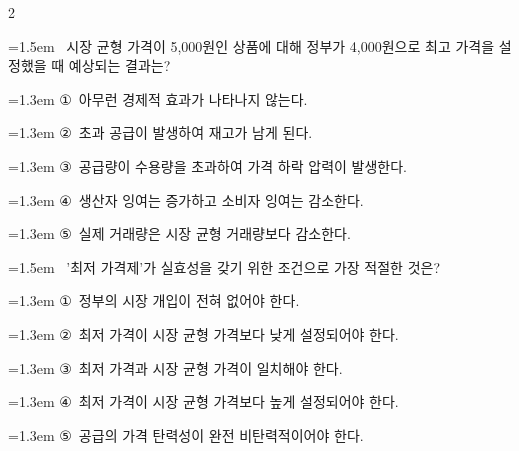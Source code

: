 \documentclass[10pt, a4paper]{article}
\begin{document}
\begin{multicols}{2}
\noindent\begin{minipage}{\columnwidth}
\vspace{2mm}
{\hangindent=1.5em  ~시장 균형 가격이 5,000원인 상품에 대해 정부가 4,000원으로 최고 가격을 설정했을 때 예상되는 결과는?\par}

\vspace{0.5mm}
{\hangindent=1.3em  \noindent\hspace{0.3em}①~아무런 경제적 효과가 나타나지 않는다.\par}
{\hangindent=1.3em  \noindent\hspace{0.3em}②~초과 공급이 발생하여 재고가 남게 된다.\par}
{\hangindent=1.3em  \noindent\hspace{0.3em}③~공급량이 수용량을 초과하여 가격 하락 압력이 발생한다.\par}
{\hangindent=1.3em  \noindent\hspace{0.3em}④~생산자 잉여는 증가하고 소비자 잉여는 감소한다.\par}
{\hangindent=1.3em  \noindent\hspace{0.3em}⑤~실제 거래량은 시장 균형 거래량보다 감소한다.\par}
\vspace{4mm}
\end{minipage}
\par

\noindent\begin{minipage}{\columnwidth}
\vspace{2mm}
{\hangindent=1.5em  ~'최저 가격제'가 실효성을 갖기 위한 조건으로 가장 적절한 것은?\par}

\vspace{0.5mm}
{\hangindent=1.3em  \noindent\hspace{0.3em}①~정부의 시장 개입이 전혀 없어야 한다.\par}
{\hangindent=1.3em  \noindent\hspace{0.3em}②~최저 가격이 시장 균형 가격보다 낮게 설정되어야 한다.\par}
{\hangindent=1.3em  \noindent\hspace{0.3em}③~최저 가격과 시장 균형 가격이 일치해야 한다.\par}
{\hangindent=1.3em  \noindent\hspace{0.3em}④~최저 가격이 시장 균형 가격보다 높게 설정되어야 한다.\par}
{\hangindent=1.3em  \noindent\hspace{0.3em}⑤~공급의 가격 탄력성이 완전 비탄력적이어야 한다.\par}
\vspace{4mm}
\end{minipage}
\par


\end{multicols}
\end{document}
